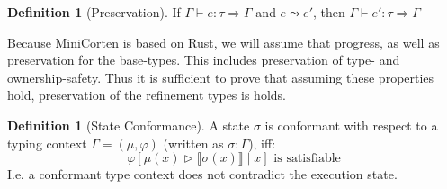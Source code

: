 \documentclass[twoside, english]{sdqthesis}
\newcommand{\bbracket}[1]{\llbracket #1 \rrbracket}
\theoremstyle{definition}
\newtheorem{definition}[theorem]{Definition}
\begin{document}
\begin{definition}[Preservation]
  If $\Gamma \vdash e : \tau \Rightarrow \Gamma$ and $e \leadsto e'$, then $\Gamma \vdash e' : \tau \Rightarrow \Gamma$
\end{definition}

Because MiniCorten is based on Rust, we will assume that progress, as well as preservation for the base-types. This includes preservation of type- and ownership-safety. Thus it is sufficient to prove that assuming these properties hold, preservation of the refinement types is holds.

\begin{definition}[State Conformance]\label{def:state-conformance}
  A state $\sigma$ is conformant with respect to a typing context $\Gamma = (\mu, \varphi)$ (written as $\sigma : \Gamma$), iff:
  $$
    \varphi[\mu(x) \triangleright \bbracket{\sigma(x)} \mid x] \text{ is satisfiable}
  $$
  I.e. a conformant type context does not contradict the execution state.
\end{definition}
\end{document}

